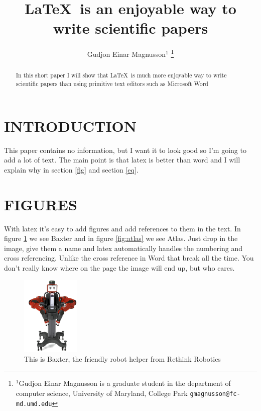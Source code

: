 \documentclass[letterpaper, 10 pt, conference]{ieeeconf}  %
\title{
\LaTeX\ is an enjoyable way to write scientific papers
}
\author{Gudjon Einar Magnusson$^{1}$
\thanks{$^{1}$Gudjon Einar Magnusson is a graduate student in the department of computer science,
        University of Maryland, College Park
        {\tt\small gmagnusson@fc-md.umd.edu}}%
}
\begin{document}
\maketitle
\thispagestyle{empty}
\pagestyle{empty}


\begin{abstract}

In this short paper I will show that \LaTeX\ is much more enjoyable way to write scientific papers than
using primitive text editors such as Microsoft Word\texttrademark\

\end{abstract}


\section{INTRODUCTION}

This paper contains no information, but I want it to look good so I'm going to add a lot of text. The main point is that latex is better than word\cite{web:kent} and I will explain why in section \ref{fig} and section \ref{eq}.

\lipsum[1]


\label{fig}
\section{FIGURES}

With latex it's easy to add figures and add references to them in the text. In figure \ref{fig:baxter} we see Baxter and in figure \ref{fig:atlas} we see Atlas. Just drop in the image, give them a name and latex automatically handles the numbering and cross referencing. Unlike the cross reference in Word that break all the time. You don't really know where on the page the image will end up, but who cares.

\begin{figure}[h]
\centering
\includegraphics[width=0.25\textwidth]{baxter}
\caption{This is Baxter, the friendly robot helper from Rethink Robotics}
\label{fig:baxter}
\end{figure}
\end{document}
